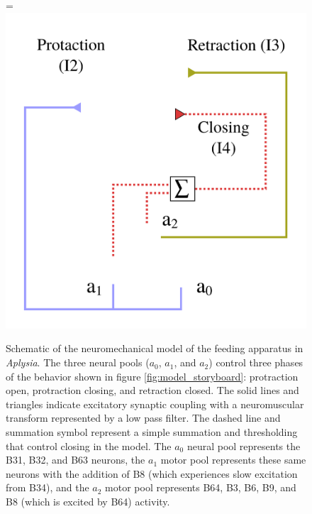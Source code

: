 \begin{figure}
    \centering
    \ifthesis
        \linewidth
    \else
        \figwidth=\linewidth
    \fi
    \includegraphics[width=\figwidth]{diagrams/model_diagram}
    \caption[Model schematic]{
        Schematic of the neuromechanical model of the feeding apparatus
        in \textit{Aplysia}.  The three neural pools ($a_0$, $a_1$, and $a_2$)
        control three phases of the behavior shown in figure
        \ref{fig:model_storyboard}: protraction open, protraction closing, and
        retraction closed.  The solid lines and triangles indicate excitatory synaptic
        coupling with a neuromuscular transform represented by a low pass
        filter.  The dashed line and summation symbol represent a simple
        summation and thresholding that control closing in the model.  The
        $a_0$ neural pool represents the B31, B32, and B63 neurons, the $a_1$ motor
        pool represents these same neurons with the addition of B8 (which experiences
        slow excitation from B34), and the $a_2$ motor pool represents B64, B3, B6, B9,
        and B8 (which is excited by B64) activity.}
    \label{fig:model_diagram}
\end{figure}

